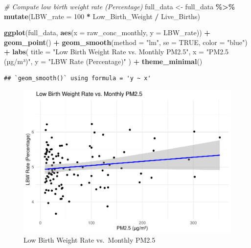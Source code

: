 \documentclass[
]{article}
\newenvironment{Shaded}{\begin{snugshade}}{\end{snugshade}}
\newcommand{\AttributeTok}[1]{\textcolor[rgb]{0.13,0.29,0.53}{#1}}
\newcommand{\CommentTok}[1]{\textcolor[rgb]{0.56,0.35,0.01}{\textit{#1}}}
\newcommand{\ConstantTok}[1]{\textcolor[rgb]{0.56,0.35,0.01}{#1}}
\newcommand{\DecValTok}[1]{\textcolor[rgb]{0.00,0.00,0.81}{#1}}
\newcommand{\FunctionTok}[1]{\textcolor[rgb]{0.13,0.29,0.53}{\textbf{#1}}}
\newcommand{\NormalTok}[1]{#1}
\newcommand{\OtherTok}[1]{\textcolor[rgb]{0.56,0.35,0.01}{#1}}
\newcommand{\SpecialCharTok}[1]{\textcolor[rgb]{0.81,0.36,0.00}{\textbf{#1}}}
\newcommand{\StringTok}[1]{\textcolor[rgb]{0.31,0.60,0.02}{#1}}
\begin{document}
\begin{Shaded}
\begin{Highlighting}[]
\CommentTok{\# Compute low birth weight rate (Percentage)}
\NormalTok{full\_data }\OtherTok{\textless{}{-}}\NormalTok{ full\_data }\SpecialCharTok{\%\textgreater{}\%} \FunctionTok{mutate}\NormalTok{(}\AttributeTok{LBW\_rate =} \DecValTok{100} \SpecialCharTok{*}\NormalTok{ Low\_Birth\_Weight }\SpecialCharTok{/}\NormalTok{ Live\_Births)}

\FunctionTok{ggplot}\NormalTok{(full\_data, }\FunctionTok{aes}\NormalTok{(}\AttributeTok{x =}\NormalTok{ raw\_conc\_monthly, }\AttributeTok{y =}\NormalTok{ LBW\_rate)) }\SpecialCharTok{+}
  \FunctionTok{geom\_point}\NormalTok{() }\SpecialCharTok{+}
  \FunctionTok{geom\_smooth}\NormalTok{(}\AttributeTok{method =} \StringTok{"lm"}\NormalTok{, }\AttributeTok{se =} \ConstantTok{TRUE}\NormalTok{, }\AttributeTok{color =} \StringTok{"blue"}\NormalTok{) }\SpecialCharTok{+}
  \FunctionTok{labs}\NormalTok{(}
    \AttributeTok{title =} \StringTok{"Low Birth Weight Rate vs. Monthly PM2.5"}\NormalTok{,}
    \AttributeTok{x =} \StringTok{"PM2.5 (µg/m³)"}\NormalTok{,}
    \AttributeTok{y =} \StringTok{"LBW Rate (Percentage)"}
\NormalTok{  ) }\SpecialCharTok{+}
  \FunctionTok{theme\_minimal}\NormalTok{()}
\end{Highlighting}
\end{Shaded}

\begin{verbatim}
## `geom_smooth()` using formula = 'y ~ x'
\end{verbatim}

\begin{figure}
\centering
\includegraphics{Project_Report_files/figure-latex/lbw-vs-pm25-1.pdf}
\caption{Low Birth Weight Rate vs.~Monthly PM2.5}
\end{figure}
\end{document}
